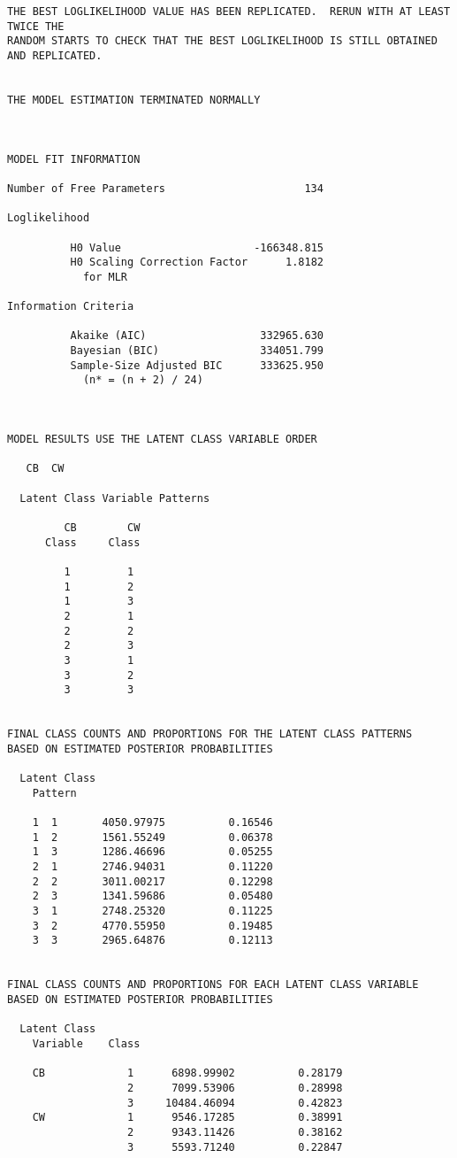 \documentclass[]{article}
\begin{document}
\begin{verbatim}
THE BEST LOGLIKELIHOOD VALUE HAS BEEN REPLICATED.  RERUN WITH AT LEAST TWICE THE
RANDOM STARTS TO CHECK THAT THE BEST LOGLIKELIHOOD IS STILL OBTAINED AND REPLICATED.


THE MODEL ESTIMATION TERMINATED NORMALLY



MODEL FIT INFORMATION

Number of Free Parameters                      134

Loglikelihood

          H0 Value                     -166348.815
          H0 Scaling Correction Factor      1.8182
            for MLR

Information Criteria

          Akaike (AIC)                  332965.630
          Bayesian (BIC)                334051.799
          Sample-Size Adjusted BIC      333625.950
            (n* = (n + 2) / 24)



MODEL RESULTS USE THE LATENT CLASS VARIABLE ORDER

   CB  CW

  Latent Class Variable Patterns

         CB        CW
      Class     Class

         1         1
         1         2
         1         3
         2         1
         2         2
         2         3
         3         1
         3         2
         3         3


FINAL CLASS COUNTS AND PROPORTIONS FOR THE LATENT CLASS PATTERNS
BASED ON ESTIMATED POSTERIOR PROBABILITIES

  Latent Class
    Pattern

    1  1       4050.97975          0.16546
    1  2       1561.55249          0.06378
    1  3       1286.46696          0.05255
    2  1       2746.94031          0.11220
    2  2       3011.00217          0.12298
    2  3       1341.59686          0.05480
    3  1       2748.25320          0.11225
    3  2       4770.55950          0.19485
    3  3       2965.64876          0.12113


FINAL CLASS COUNTS AND PROPORTIONS FOR EACH LATENT CLASS VARIABLE
BASED ON ESTIMATED POSTERIOR PROBABILITIES

  Latent Class
    Variable    Class

    CB             1      6898.99902          0.28179
                   2      7099.53906          0.28998
                   3     10484.46094          0.42823
    CW             1      9546.17285          0.38991
                   2      9343.11426          0.38162
                   3      5593.71240          0.22847



\end{verbatim}
\end{document}
